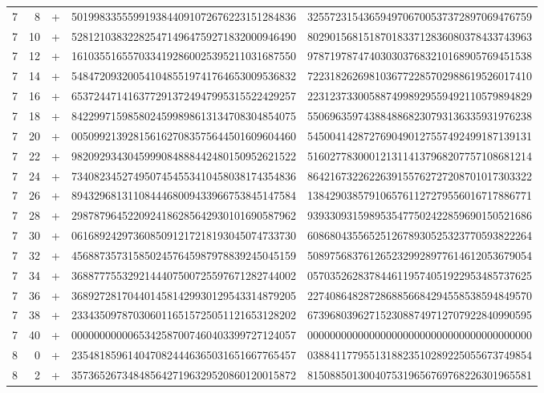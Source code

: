 \begin{longtable}{rrrll}
7 & 8 & + & 5019983355599193844091072676223151284836 & 3255723154365949706700537372897069476759 \\
7 & 10 & + & 5281210383228254714964759271832000946490 & 8029015681518701833712836080378433743963 \\
7 & 12 & + & 1610355165570334192860025395211031687550 & 9787197874740303037683210168905769451538 \\
7 & 14 & + & 5484720932005410485519741764653009536832 & 7223182626981036772285702988619526017410 \\
7 & 16 & + & 6537244714163772913724947995315522429257 & 2231237330058874998929559492110579894829 \\
7 & 18 & + & 8422997159858024599898613134708304854075 & 5506963597438848868230793136335931976238 \\
7 & 20 & + & 0050992139281561627083575644501609604460 & 5450041428727690490127557492499187139131 \\
7 & 22 & + & 9820929343045999084888442480150952621522 & 5160277830001213114137968207757108681214 \\
7 & 24 & + & 7340823452749507454553410458038174354836 & 8642167322622639155762727208701017303322 \\
7 & 26 & + & 8943296813110844468009433966753845147584 & 1384290385791065761127279556016717886771 \\
7 & 28 & + & 2987879645220924186285642930101690587962 & 9393309315989535477502422859690150521686 \\
7 & 30 & + & 0616892429736085091217218193045074733730 & 6086804355652512678930525323770593822264 \\
7 & 32 & + & 4568873573158502457645987978839245045159 & 5089756837612652329928977614612053679054 \\
7 & 34 & + & 3688777553292144407500725597671282744002 & 0570352628378446119574051922953485737625 \\
7 & 36 & + & 3689272817044014581429930129543314879205 & 2274086482872868856684294558538594849570 \\
7 & 38 & + & 2334350978703060116515725051121653128202 & 6739680396271523088749712707922840990595 \\
7 & 40 & + & 0000000000065342587007460403399727124057 & 0000000000000000000000000000000000000000 \\
8 & 0 & + & 2354818596140470824446365031651667765457 & 0388411779551318823510289225055673749854 \\
8 & 2 & + & 3573652673484856427196329520860120015872 & 8150885013004075319656769768226301965581 \\

\end{longtable}
